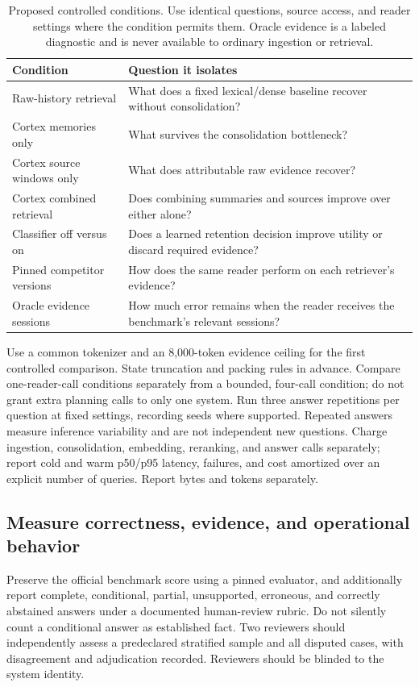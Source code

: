 \begin{table}[htbp]
\centering\small
\begin{tabularx}{\linewidth}{@{}L{.29\linewidth}Y@{}}
\toprule
Condition & Question it isolates\\
\midrule
Raw-history retrieval & What does a fixed lexical/dense baseline recover without consolidation?\\
Cortex memories only & What survives the consolidation bottleneck?\\
Cortex source windows only & What does attributable raw evidence recover?\\
Cortex combined retrieval & Does combining summaries and sources improve over either alone?\\
Classifier off versus on & Does a learned retention decision improve utility or discard required evidence?\\
Pinned competitor versions & How does the same reader perform on each retriever's evidence?\\
Oracle evidence sessions & How much error remains when the reader receives the benchmark's relevant sessions?\\
\bottomrule
\end{tabularx}
\caption{Proposed controlled conditions. Use identical questions, source access, and reader settings where the condition permits them. Oracle evidence is a labeled diagnostic and is never available to ordinary ingestion or retrieval.}
\label{tab:ablation-plan}
\end{table}

Use a common tokenizer and an 8,000-token evidence ceiling for the first controlled comparison. State truncation and packing rules in advance. Compare one-reader-call conditions separately from a bounded, four-call condition; do not grant extra planning calls to only one system. Run three answer repetitions per question at fixed settings, recording seeds where supported. Repeated answers measure inference variability and are not independent new questions. Charge ingestion, consolidation, embedding, reranking, and answer calls separately; report cold and warm p50/p95 latency, failures, and cost amortized over an explicit number of queries. Report bytes and tokens separately.

\subsection{Measure correctness, evidence, and operational behavior}
Preserve the official benchmark score using a pinned evaluator, and additionally report complete, conditional, partial, unsupported, erroneous, and correctly abstained answers under a documented human-review rubric. Do not silently count a conditional answer as established fact. Two reviewers should independently assess a predeclared stratified sample and all disputed cases, with disagreement and adjudication recorded. Reviewers should be blinded to the system identity.

